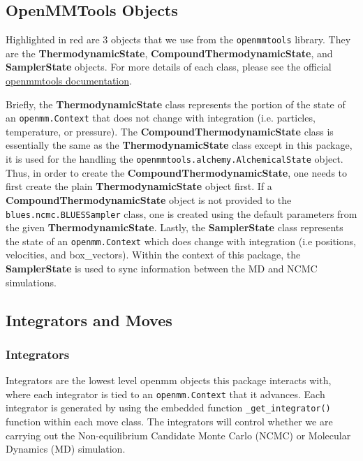 \hypertarget{openmmtools-objects}{%
\subsection{OpenMMTools Objects}\label{openmmtools-objects}}

Highlighted in red are 3 objects that we use from the
\texttt{openmmtools} library. They are the \textbf{ThermodynamicState},
\textbf{CompoundThermodynamicState}, and \textbf{SamplerState} objects.
For more details of each class, please see the official
\href{https://openmmtools.readthedocs.io/en/0.18.1/states.html\#thermodynamic-and-sampler-states}{openmmtools
documentation}.

Briefly, the \textbf{ThermodynamicState} class represents the portion of the state of an \texttt{openmm.Context} that does not change with integration (i.e. particles, temperature, or pressure).
The \textbf{CompoundThermodynamicState} class is essentially the same as the \textbf{ThermodynamicState} class except in this package, it is used for the handling the \texttt{openmmtools.alchemy.AlchemicalState} object.
Thus, in order to create the \textbf{CompoundThermodynamicState}, one needs to first create the plain \textbf{ThermodynamicState} object first. 
If a \textbf{CompoundThermodynamicState} object is not provided to the \texttt{blues.ncmc.BLUESSampler} class, one is created using the default parameters from the given \textbf{ThermodynamicState}. 
Lastly, the \textbf{SamplerState} class represents the state of an \texttt{openmm.Context} which does change with integration (i.e positions, velocities, and box\_vectors). 
Within the context of this package, the \textbf{SamplerState} is used to sync information between the MD and NCMC simulations.

\hypertarget{integrators-and-moves}{%
\subsection{Integrators and Moves}\label{integrators-and-moves}}

\subsubsection{Integrators} 
Integrators are the lowest level openmm objects this package interacts with, where each integrator is tied to an \texttt{openmm.Context} that it advances. 
Each integrator is generated by using the embedded function \texttt{_get_integrator()} function within each move class.
The integrators will control whether we are carrying out the Non-equilibrium Candidate Monte Carlo (NCMC) or Molecular Dynamics (MD) simulation.

